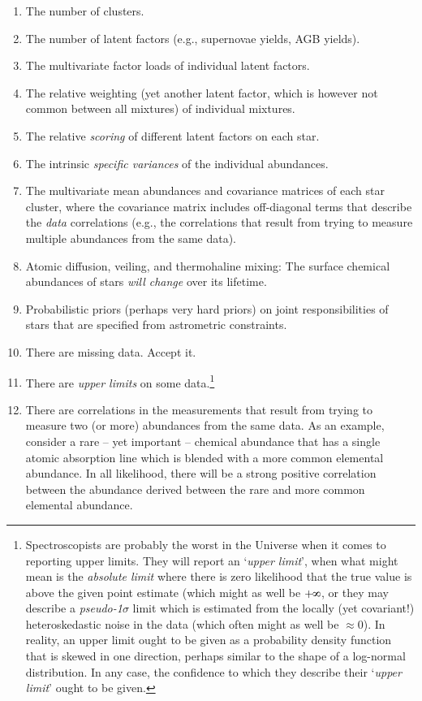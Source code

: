 \documentclass{aastex61}
\def\infinity{\rotatebox{90}{8}}
\begin{document}
\begin{enumerate}
\item The number of clusters.
\item The number of latent factors (e.g., supernovae yields, AGB yields).
\item The multivariate factor loads of individual latent factors.
\item The relative weighting (yet another latent factor, which is however not
      common between all mixtures) of individual mixtures.
\item The relative \emph{scoring} of different latent factors on each star.
\item The intrinsic \emph{specific variances} of the individual abundances.
\item The multivariate mean abundances and covariance matrices of each star
      cluster, where the covariance matrix includes off-diagonal terms that
      describe the \emph{data} correlations (e.g., the correlations that result
      from trying to measure multiple abundances from the same data).
\item Atomic diffusion, veiling, and thermohaline mixing: The surface chemical
      abundances of stars \emph{will change} over its lifetime.
\item Probabilistic priors (perhaps very hard priors) on joint responsibilities
      of stars that are specified from astrometric constraints.
\item There are missing data. Accept it.
\item There are \emph{upper limits} on some data.\footnote{
        Spectroscopists are probably the worst in the Universe when it comes to
        reporting upper limits. They will report an `\emph{upper limit}', when
        what might mean is the \emph{absolute limit} where there is zero
        likelihood that the true value is above the given point estimate (which might as well be $+\infinity$, or
        they may describe a \emph{pseudo-1$\sigma$} limit which is estimated
        from the locally (yet covariant!) heteroskedastic noise in the data (which often might as well be $\approx$0).
        In reality, an upper limit ought to be given as a probability density
        function that is skewed in one direction, perhaps similar to the shape
        of a log-normal distribution. In any case, the confidence to which they
        describe their `\emph{upper limit}' ought to be given.}
\item There are correlations in the measurements that result from trying to
      measure two (or more) abundances from the same data. As an example,
      consider a rare -- yet important -- chemical abundance that has a single
      atomic absorption line which is blended with a more common elemental
      abundance. In all likelihood, there will be a strong positive correlation
      between the abundance derived between the rare and more common elemental
      abundance.
\end{enumerate}
\end{document}

